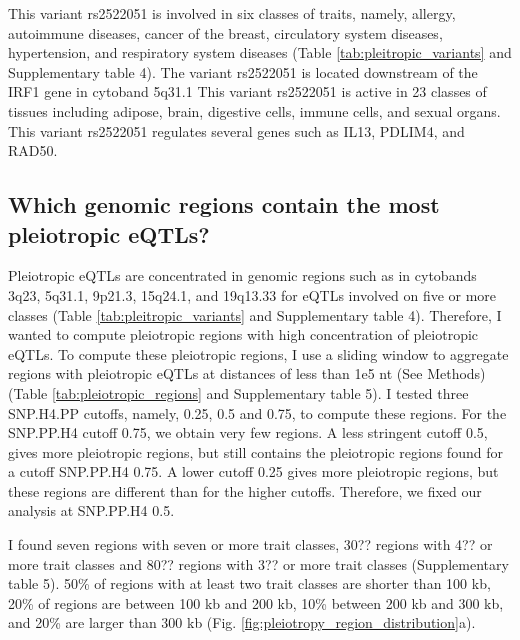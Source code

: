 This variant rs2522051 is involved in six classes of traits, namely,
allergy, autoimmune diseases, cancer of the breast, circulatory system diseases, hypertension, and respiratory system diseases
(Table \ref{tab:pleitropic_variants} and Supplementary table 4).
%
The variant rs2522051 is located downstream of the IRF1 gene in cytoband 5q31.1
%
This variant rs2522051 is active in 23 classes of tissues including adipose, brain, digestive cells, immune cells, and sexual organs.
%
This variant rs2522051 regulates several genes such as IL13, PDLIM4, and RAD50.

%
\subsection*{Which genomic regions contain the most pleiotropic eQTLs?}
%

Pleiotropic eQTLs are concentrated in genomic regions such as in cytobands 3q23,
5q31.1, 9p21.3, 15q24.1, and 19q13.33 for eQTLs involved on five or more classes (Table \ref{tab:pleitropic_variants} and Supplementary table 4).
%
Therefore, I wanted to compute pleiotropic regions with high concentration of pleiotropic eQTLs.
%
To compute these pleiotropic regions, I use a sliding window to aggregate regions with pleiotropic eQTLs at distances
of less than 1e5 nt (See Methods) (Table \ref{tab:pleiotropic_regions} and Supplementary table 5).
%
I tested three SNP.H4.PP cutoffs, namely, 0.25, 0.5 and 0.75, to compute these regions.
%
For the SNP.PP.H4 cutoff 0.75, we obtain very few regions.
%
A less stringent cutoff 0.5, gives more pleiotropic regions, but still contains the pleiotropic regions found for a
cutoff SNP.PP.H4 0.75.
%
A lower cutoff 0.25 gives more pleiotropic regions, but these regions are different than for the higher cutoffs.
%
Therefore, we fixed our analysis at SNP.PP.H4 0.5.

%
I found seven regions with seven or more trait classes, 30?? regions with 4?? or more trait
classes and 80?? regions with 3?? or more trait classes (Supplementary table 5).
%
50\% of regions with at least two trait classes are shorter than 100 kb, 20\% of regions are
between 100 kb and 200 kb, 10\% between 200 kb and 300 kb, and 20\% are larger than 300 kb (Fig. \ref{fig:pleiotropy_region_distribution}a).


